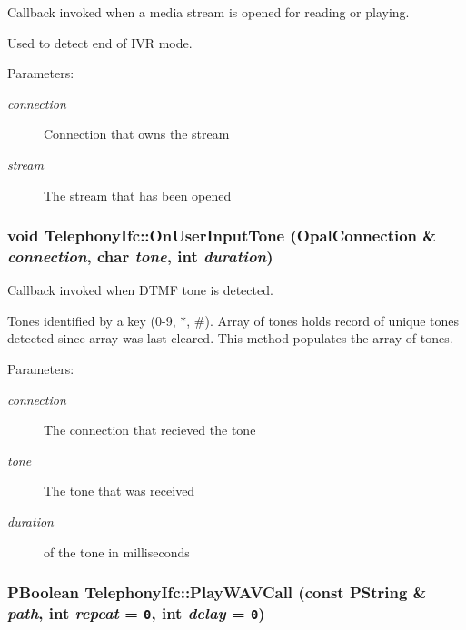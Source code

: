 Callback invoked when a media stream is opened for reading or playing. 

Used to detect end of IVR mode. \begin{Desc}
\item[Parameters:]
\begin{description}
\item[{\em connection}]Connection that owns the stream \item[{\em stream}]The stream that has been opened \end{description}
\end{Desc}
\hypertarget{classTelephonyIfc_085ab0d59a990bda8b17cb56b1baaeb1}{
\subsubsection[{OnUserInputTone}]{\setlength{\rightskip}{0pt plus 5cm}void TelephonyIfc::OnUserInputTone (OpalConnection \& {\em connection}, \/  char {\em tone}, \/  int {\em duration})}}
\label{classTelephonyIfc_085ab0d59a990bda8b17cb56b1baaeb1}


Callback invoked when DTMF tone is detected. 

Tones identified by a key (0-9, $\ast$, \#). Array of tones holds record of unique tones detected since array was last cleared. This method populates the array of tones. \begin{Desc}
\item[Parameters:]
\begin{description}
\item[{\em connection}]The connection that recieved the tone \item[{\em tone}]The tone that was received \item[{\em duration}]of the tone in milliseconds \end{description}
\end{Desc}
\hypertarget{classTelephonyIfc_15c768f4f006a0dbe7b16c8b44ccb9cb}{
\subsubsection[{PlayWAVCall}]{\setlength{\rightskip}{0pt plus 5cm}PBoolean TelephonyIfc::PlayWAVCall (const PString \& {\em path}, \/  int {\em repeat} = {\tt 0}, \/  int {\em delay} = {\tt 0})}}
\label{classTelephonyIfc_15c768f4f006a0dbe7b16c8b44ccb9cb}


